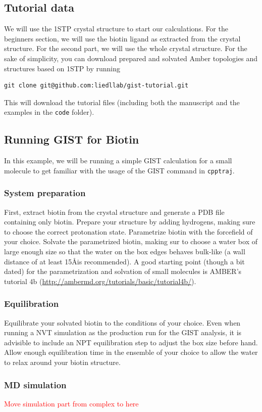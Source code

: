 \documentclass[9pt,tutorial]{livecoms}
\newcommand{\software}{\texttt}
\newcommand{\todo}{\textcolor{red}}
\begin{document}
\subsection{Tutorial data}
We will use the 1STP crystal structure to start our calculations. For the beginners section, we will use the biotin ligand as extracted from the crystal structure. For the second part, we will use the whole crystal structure.
For the sake of simplicity, you can download prepared and solvated Amber topologies and structures based on 1STP by running
\begin{lstlisting}[style=bash]
git clone git@github.com:liedllab/gist-tutorial.git
\end{lstlisting}
This will download the tutorial files (including both the manuscript and the examples in the \software{code} folder).
\
\subsection{Running GIST for Biotin}
In this example, we will be running a simple GIST calculation for a small molecule to get familiar with the usage of the GIST command in \software{cpptraj}.
\subsubsection{System preparation}
First, extract biotin from the crystal structure and generate a PDB file containing only biotin. Prepare your structure by adding hydrogens, making sure to choose the correct protonation state. Parametrize biotin with the forcefield of your choice. Solvate the parametrized biotin, making sur to choose a water box of large enough size so that the water on the box edges behaves bulk-like (a wall distance of at least 15\AA is recommended). A good starting point (though a bit dated) for the parametrization and solvation of small molecules is AMBER's tutorial 4b (\url{http://ambermd.org/tutorials/basic/tutorial4b/}). 
\subsubsection{Equilibration}
Equilibrate your solvated biotin to the conditions of your choice. Even when running a NVT simulation as the production run for the GIST analysis, it is advisible to include an NPT equilibration step to adjust the box size before hand. Allow enough equilibration time in the ensemble of your choice to allow the water to relax around your biotin structure.

\subsubsection{MD simulation}
\todo{Move simulation part from complex to here}
\end{document}
